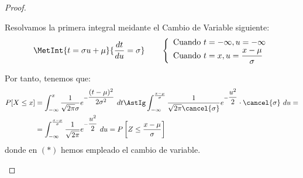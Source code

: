 \begin{proof}
\begin{enumerate}
        Resolvamos la primera integral meidante el Cambio de Variable siguiente:
        \begin{equation*}
            \MetInt{t = \sigma u + \mu}{\dfrac{dt}{du} = \sigma} \qquad
            \left\{
                \begin{array}{l}
                    \text{Cuando } t = -\infty, u = -\infty\\
                    \text{Cuando } t = x, u = \dfrac{x-\mu}{\sigma}
                \end{array}
            \right.
        \end{equation*}

        Por tanto, tenemos que:
        \begin{align*}
            P[X\leq x] &= \int_{-\infty}^{x} \dfrac{1}{\sqrt{2\pi}\sigma} e^{-\dfrac{(t-\mu)^2}{2\sigma^2}}~dt
            \AstIg \int_{-\infty}^{\frac{x-\mu}{\sigma}} \dfrac{1}{\sqrt{2\pi}\cancel{\sigma}} e^{-\dfrac{u^2}{2}}\cdot \cancel{\sigma} ~ du
            =\\&= \int_{-\infty}^{\frac{x-\mu}{\sigma}} \dfrac{1}{\sqrt{2\pi}} e^{-\dfrac{u^2}{2}}~du
            = P\left[Z\leq \dfrac{x-\mu}{\sigma}\right]
        \end{align*}
        donde en $(\ast)$ hemos empleado el cambio de variable.
    \end{enumerate}
\end{proof}

